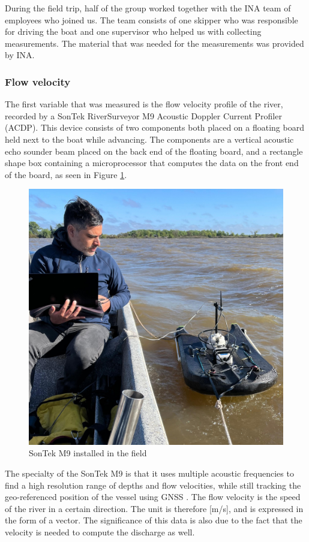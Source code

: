 During the field trip, half of the group worked together with the INA team of employees who joined us. The team consists of one skipper who was responsible for driving the boat and one supervisor who helped us with collecting measurements. The material that was needed for the measurements was provided by INA. 


\subsubsection{Flow velocity}
The first variable that was measured is the flow velocity profile of the river, recorded by a SonTek RiverSurveyor M9 Acoustic Doppler Current Profiler (ACDP). This device consists of two components both placed on a floating board held next to the boat while advancing. The components are a vertical acoustic echo sounder beam placed on the back end of the floating board, and a rectangle shape box containing a microprocessor that computes the data on the front end of the board, as seen in Figure \ref{fig:SonTekmeasurement}.

\begin{figure}[H]
    \centering
    \includegraphics[width=0.5\linewidth]{figures/ch4/sonteknico.jpg}
    \caption{SonTek M9 installed in the field}
    \label{fig:SonTekmeasurement}
\end{figure}

The specialty of the SonTek M9 is that it uses multiple acoustic frequencies to find a high resolution range of depths and flow velocities, while still tracking the geo-referenced position of the vessel using GNSS \autocite{ysiinc.SonTekM9}. The flow velocity is the speed of the river in a certain direction. The unit is therefore  [m/s], and is expressed in the form of a vector. The significance of this data is also due to the fact that the velocity is needed to compute the discharge as well.

